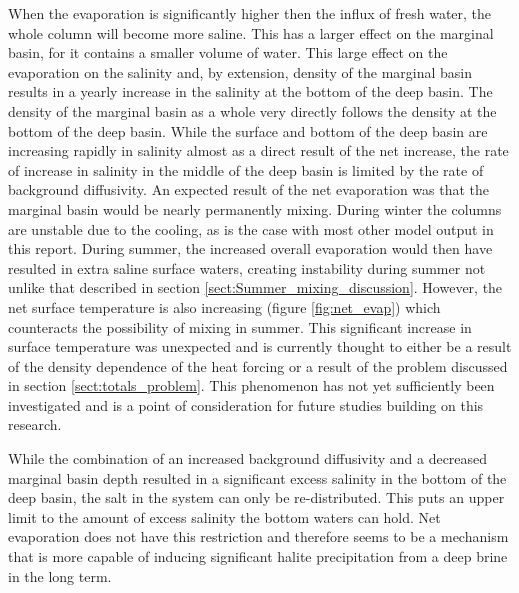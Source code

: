 \documentclass[twocolumn]{article}
\begin{document}
When the evaporation is significantly higher then the influx of fresh water, the whole column will become more saline. This has a larger effect on the marginal basin, for it contains a smaller volume of water. This large effect on the evaporation on the salinity and, by extension, density of the marginal basin results in a yearly increase in the salinity at the bottom of the deep basin. The density of the marginal basin as a whole very directly follows the density at the bottom of the deep basin. While the surface and bottom of the deep basin are increasing rapidly in salinity almost as a direct result of the net increase, the rate of increase in salinity in the middle of the deep basin is limited by the rate of background diffusivity.
An expected result of the net evaporation was that the marginal basin would be nearly permanently mixing. During winter the columns are unstable due to the cooling, as is the case with most other model output in this report. During summer, the increased overall evaporation would then have resulted in extra saline surface waters, creating instability during summer not unlike that described in section \ref{sect:Summer_mixing_discussion}. However, the net surface temperature is also increasing (figure \ref{fig:net_evap}) which counteracts the possibility of mixing in summer. This significant increase in surface temperature was unexpected and is currently thought to either be a result of the density dependence of the heat forcing or a result of the problem discussed in section \ref{sect:totals_problem}. This phenomenon has not yet sufficiently been investigated and is a point of consideration for future studies building on this research.


While the combination of an increased background diffusivity and a decreased marginal basin depth resulted in a significant excess salinity in the bottom of the deep basin, the salt in the system can only be re-distributed. This puts an upper limit to the amount of excess salinity the bottom waters can hold. Net evaporation does not have this restriction and therefore seems to be a mechanism that is more capable of inducing significant halite precipitation from a deep brine in the long term.
\end{document}
